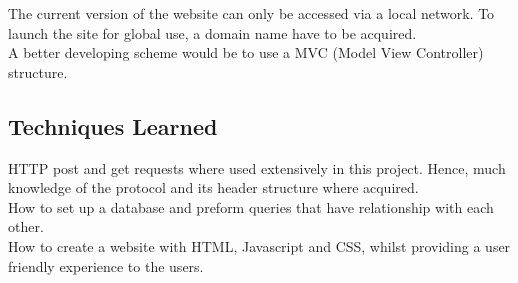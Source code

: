 \documentclass[a4paper,12pt]{article}
\numberwithin{equation}{section} %
\numberwithin{figure}{section}
\begin{document}
The current version of the website can only be accessed via a local network. To launch the site for global use, a domain name have to be acquired.\\

A better developing scheme would be to use a MVC (Model View Controller) structure. 

\subsection{Techniques Learned}
HTTP post and get requests where used extensively in this project. Hence, much knowledge of the protocol and its header structure where acquired. \\

How to set up a database and preform queries that have relationship with each other.\\

How to create a website with HTML, Javascript and CSS, whilst providing a user friendly experience to the users.


\nocite{*} %

\end{document}
